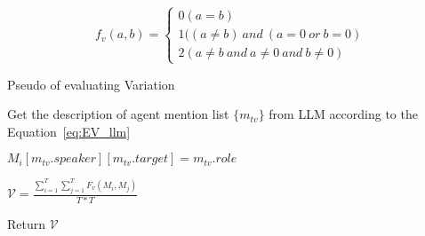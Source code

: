\begin{equation} 
f_{v}(a,b)=
    \begin{cases}
    0(a=b)\\
    1((a\ne b)\ and\ (a=0\ or\ b=0)\\
    2(a\ne b\ and\ a\ne0\ and\ b\ne0)
    \end{cases}
    \label{eq:EV_dis2}
\end{equation}



\begin{algorithm*}[htbp]

    \renewcommand{\arraystretch}{1.3}
    \setlength{\tabcolsep}{10pt}
  
    \caption{Pseudo of evaluating Variation }
  
    \label{alg:EvaluationVariation}

    Get the description of agent mention list $ \{ m_{tv} \} $ from LLM according to the Equation~\ref{eq:EV_llm}
    
     {
         {
            $ M_i[m_{tv}.speaker][m_{tv}.target]=m_{tv}.role $
        }
    }

    $ \mathcal{V} = \frac{\sum_{i=1}^{T}\sum_{j=1}^{T} {F_{v} (M_i,M_j)}} { T * T } $ 

    Return $ \mathcal{V} $  
  
\end{algorithm*}


